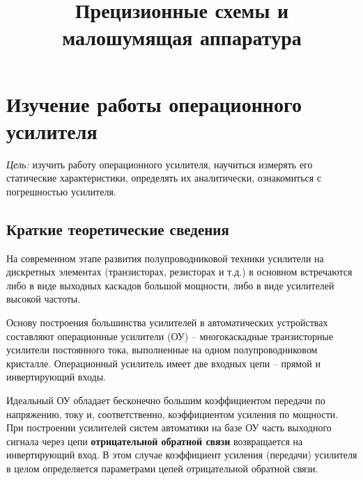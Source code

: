 \documentclass[a4paper,12pt]{article}
\title{Прецизионные схемы и малошумящая аппаратура}
\author{}
\begin{document}

\section{Изучение работы операционного усилителя}

{\it Цель:} изучить работу операционного усилителя, научиться измерять его статические характеристики, определять их аналитически, ознакомиться с погрешностью усилителя.
 
\subsection{Краткие теоретические сведения}

На современном этапе развития полупроводниковой техники усилители на дискретных элементах (транзисторах, резисторах и т.д.) в основном встречаются либо в виде выходных каскадов большой мощности, либо в виде усилителей высокой частоты.

Основу построения большинства усилителей в автоматических устройствах составляют операционные усилители (ОУ) -- многокаскадные транзисторные усилители постоянного тока, выполненные на одном полупроводниковом кристалле. 
Операционный усилитель имеет две входных цепи -- прямой и инвертирующий входы.

Идеальный ОУ обладает бесконечно большим коэффициентом передачи по напряжению, току и, соответственно, коэффициентом усиления по мощности. При построении усилителей систем автоматики на базе ОУ часть выходного сигнала через цепи {\bf отрицательной обратной связи} 
возвращается на инвертирующий вход. 
В этом случае коэффициент усиления (передачи) усилителя в целом определяется параметрами цепей отрицательной обратной связи.
\end{document}
